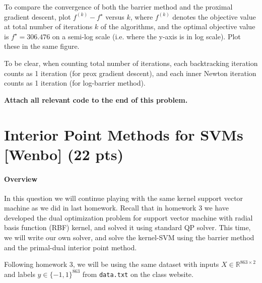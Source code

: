 \documentclass{article}
\theoremstyle{remark}
\theoremstyle{definition}
\begin{document}
\begin{enumerate}[(a)]
\begin{enumerate}
	    To compare the convergence of both the barrier method and the proximal gradient descent, plot $f^{(k)} - f^{\star}$ versus $k$,  where $f^{(k)}$ denotes the objective value at total number of iterations $k$ of the algorithms, and the optimal objective value is $f^\star = 306.476$ on a semi-log scale (i.e. where the y-axis is in log scale). Plot these in the same figure. 

      To be clear, when counting total number of iterations, each backtracking iteration counts as 1 iteration (for prox gradient descent), and each inner Newton iteration counts as 1 iteration (for log-barrier method).
	    \end{enumerate}
\end{enumerate}

\textbf{Attach all relevant code to the end of this problem.}
\section{Interior Point Methods for SVMs [Wenbo] (22 pts)}

\paragraph{Overview} In this question we will continue playing with the same kernel support vector machine as we did in last homework. Recall that in homework 3 we have developed the dual optimization problem for support vector machine with radial basis function (RBF) kernel, and solved it using standard QP solver. This time, we will write our own solver, and solve the kernel-SVM using the
barrier method and the primal-dual interior point method.

Following homework 3, we will be using the same dataset with inputs $X \in \mathbb R^{863 \times 2}$ and labels $y \in \{-1, 1\}^{863}$ from \texttt{data.txt} on the class website.
\end{document}
